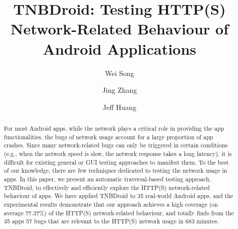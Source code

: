 \documentclass[sigconf,review, anonymous]{acmart}
\begin{document}
\title{TNBDroid: Testing HTTP(S) Network-Related Behaviour of Android Applications}


\author{Wei Song}

\author{Jing Zhang}

\author{Jeff Huang}




\begin{abstract}
For most Android apps, while the network plays a critical role in providing the app functionalities, the bugs of network usage account for a large proportion of app crashes. Since many network-related bugs can only be triggered in certain conditions (e.g., when the network speed is slow, the network response takes a long latency), it is difficult for existing general or GUI testing approaches to manifest them. To the best of our knowledge, there are few techniques dedicated to testing the network usage in apps. In this paper, we present an automatic traversal-based testing approach, \textsf{TNBDroid}, to effectively and efficiently explore the HTTP(S) network-related behaviour of apps. We have applied \textsf{TNBDroid} to 35 real-world Android apps, and the experimental results demonstrate that our approach achieves a high coverage (on average 77.37\%) of the HTTP(S) network-related behaviour, and totally finds from the 35 apps 57 bugs that are relevant to the HTTP(S) network usage in 683 minutes.
\end{abstract}
\end{document}
